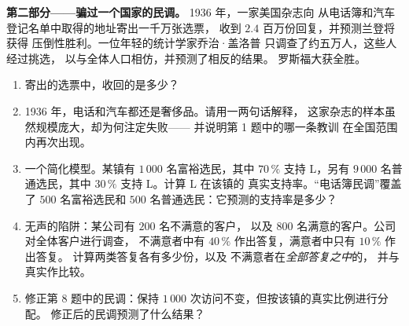 \begin{problem}
\medskip
\noindent\textbf{第二部分——骗过一个国家的民调。}
1936 年，一家美国杂志向
从电话簿和汽车登记名单中取得的地址寄出一千万张选票，
收到 $2.4$ 百万份回复，并预测兰登将获得
压倒性胜利。一位年轻的统计学家乔治·盖洛普
只调查了约五万人，这些人经过挑选，
以与全体人口相仿，并预测了相反的结果。
罗斯福大获全胜。
\begin{enumerate}[resume]
  \item 寄出的选票中，收回的是多少？
  \item 1936 年，电话和汽车都还是奢侈品。请用一两句话解释，
        这家杂志的样本虽然规模庞大，却为何注定失败——
        并说明第 1 题中的哪一条教训
        在全国范围内再次出现。
  \item 一个简化模型。某镇有 $1\,000$ 名富裕选民，其中
        $70\,\%$ 支持 L，另有 $9\,000$ 名普通选民，其中
        $30\,\%$ 支持 L。计算 L 在该镇的
        真实支持率。“电话簿民调”覆盖了 $500$ 名富裕选民和
        $500$ 名普通选民：它预测的支持率是多少？
  \item 无声的陷阱：某公司有 $200$ 名不满意的客户，
        以及 $800$ 名满意的客户。公司对全体客户进行调查，
        不满意者中有 $40\,\%$ 作出答复，满意者中只有 $10\,\%$ 作出答复。
        计算两类答复各有多少份，以及
        不满意者在\emph{全部答复之中}的，
        并与真实作比较。
  \item 修正第 8 题中的民调：保持 $1\,000$
        次访问不变，但按该镇的真实比例进行分配。
        修正后的民调预测了什么结果？
\end{enumerate}


\end{problem}
